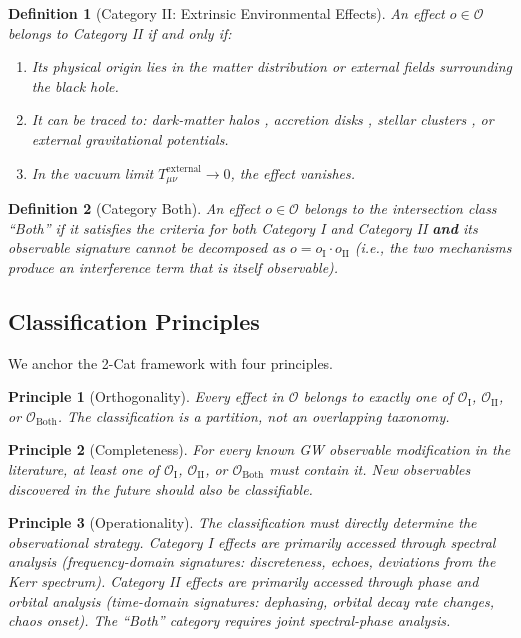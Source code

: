 \documentclass[11pt]{article}
\newtheorem{definition}{Definition}[section]
\newtheorem{principle}{Principle}[section]
\begin{document}
\begin{definition}[Category II: Extrinsic Environmental Effects]\label{def:catII}
An effect $o \in \mathcal{O}$ belongs to Category II if and only if:
\begin{enumerate}
\item Its physical origin lies in the matter distribution or external fields surrounding the black hole.
\item It can be traced to: dark-matter halos \cite{Barausse:2020,Gair:2013}, accretion disks \cite{Frank:2021}, stellar clusters \cite{Peterson:2004}, or external gravitational potentials.
\item In the vacuum limit $T_{\mu\nu}^{\mathrm{external}} \to 0$, the effect vanishes.
\end{enumerate}
\end{definition}

\begin{definition}[Category Both]\label{def:both}
An effect $o \in \mathcal{O}$ belongs to the intersection class ``Both'' if it satisfies the criteria for both Category I and Category II \textbf{and} its observable signature cannot be decomposed as $o = o_{\mathrm{I}} \cdot o_{\mathrm{II}}$ (i.e., the two mechanisms produce an interference term that is itself observable).
\end{definition}

\subsection{Classification Principles}

We anchor the 2-Cat framework with four principles.

\begin{principle}[Orthogonality]\label{prin:ortho}
Every effect in $\mathcal{O}$ belongs to exactly one of $\mathcal{O}_{\mathrm{I}}$, $\mathcal{O}_{\mathrm{II}}$, or $\mathcal{O}_{\mathrm{Both}}$. The classification is a partition, not an overlapping taxonomy.
\end{principle}

\begin{principle}[Completeness]\label{prin:complete}
For every known GW observable modification in the literature, at least one of $\mathcal{O}_{\mathrm{I}}$, $\mathcal{O}_{\mathrm{II}}$, or $\mathcal{O}_{\mathrm{Both}}$ must contain it. New observables discovered in the future should also be classifiable.
\end{principle}

\begin{principle}[Operationality]\label{prin:operational}
The classification must directly determine the observational strategy. Category I effects are primarily accessed through \emph{spectral analysis} (frequency-domain signatures: discreteness, echoes, deviations from the Kerr spectrum). Category II effects are primarily accessed through \emph{phase and orbital analysis} (time-domain signatures: dephasing, orbital decay rate changes, chaos onset). The ``Both'' category requires joint spectral-phase analysis.
\end{principle}
\end{document}

